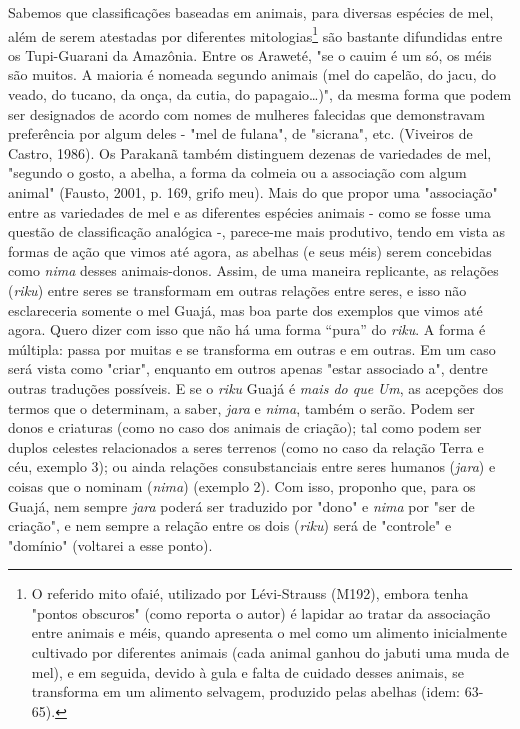 Sabemos que classificações baseadas em animais, para diversas espécies
de mel, além de serem atestadas por diferentes mitologias\footnote{O
  referido mito ofaié, utilizado por Lévi-Strauss (M192), embora tenha
  "pontos obscuros" (como reporta o autor) é lapidar ao tratar da
  associação entre animais e méis, quando apresenta o mel como um
  alimento inicialmente cultivado por diferentes animais (cada animal
  ganhou do jabuti uma muda de mel), e em seguida, devido à gula e falta
  de cuidado desses animais, se transforma em um alimento selvagem,
  produzido pelas abelhas (idem: 63-65).} são bastante difundidas entre
os Tupi-Guarani da Amazônia. Entre os Araweté, "se o cauim é um só, os
méis são muitos. A maioria é nomeada segundo animais (mel do capelão, do
jacu, do veado, do tucano, da onça, da cutia, do papagaio\ldots{})", da mesma
forma que podem ser designados de acordo com nomes de mulheres falecidas
que demonstravam preferência por algum deles - "mel de fulana", de
"sicrana", etc. (Viveiros de Castro, 1986). Os Parakanã também
distinguem dezenas de variedades de mel, "segundo o gosto, a abelha, a
forma da colmeia ou a associação com algum animal" (Fausto, 2001, p.
169, grifo meu). Mais do que propor uma "associação" entre as variedades
de mel e as diferentes espécies animais - como se fosse uma questão de
classificação analógica -, parece-me mais produtivo, tendo em vista as
formas de ação que vimos até agora, as abelhas (e seus méis) serem
concebidas como \emph{nima} desses animais-donos. Assim, de uma maneira
replicante, as relações (\emph{riku}) entre seres se transformam em
outras relações entre seres, e isso não esclareceria somente o mel
Guajá, mas boa parte dos exemplos que vimos até agora. Quero dizer com
isso que não há uma forma ``pura'' do \emph{riku}. A forma é múltipla:
passa por muitas e se transforma em outras e em outras. Em um caso será
vista como "criar", enquanto em outros apenas "estar associado a",
dentre outras traduções possíveis. E se o \emph{riku} Guajá é \emph{mais
do que} \emph{Um}, as acepções dos termos que o determinam, a saber,
\emph{jara} e \emph{nima}, também o serão. Podem ser donos e criaturas
(como no caso dos animais de criação); tal como podem ser duplos
celestes relacionados a seres terrenos (como no caso da relação Terra e
céu, exemplo 3); ou ainda relações consubstanciais entre seres humanos
(\emph{jara}) e coisas que o nominam (\emph{nima}) (exemplo 2). Com
isso, proponho que, para os Guajá, nem sempre \emph{jara} poderá ser
traduzido por "dono" e \emph{nima} por "ser de criação", e nem sempre a
relação entre os dois (\emph{riku}) será de "controle" e "domínio"
(voltarei a esse ponto).

